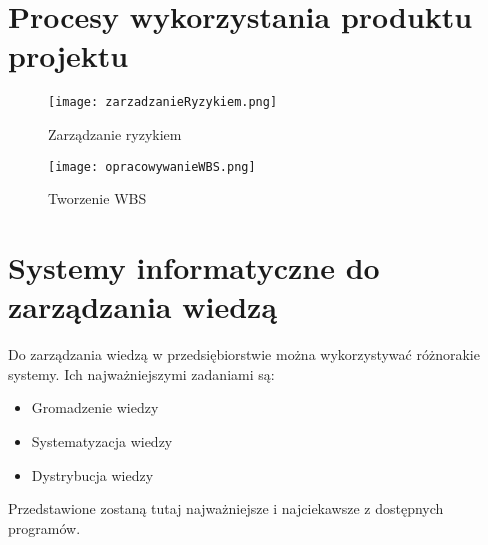 
\section{Procesy wykorzystania produktu projektu}

\begin{figure}[!h]
\centering
\texttt{[image: zarzadzanieRyzykiem.png]}
\caption{Zarządzanie ryzykiem}
\label{fig:zarzadzanieRyzykiem}
\end{figure}

\begin{figure}[!h]
\centering
\texttt{[image: opracowywanieWBS.png]}
\caption{Tworzenie WBS}
\label{fig:opracowanieWBS}
\end{figure}

\clearpage


\section{Systemy informatyczne do zarządzania wiedzą}

Do zarządzania wiedzą w przedsiębiorstwie można wykorzystywać różnorakie systemy. Ich najważniejszymi zadaniami są:
\begin{itemize}
\item Gromadzenie wiedzy
\item Systematyzacja wiedzy
\item Dystrybucja wiedzy
\end{itemize}

Przedstawione zostaną tutaj najważniejsze i najciekawsze z dostępnych programów.


